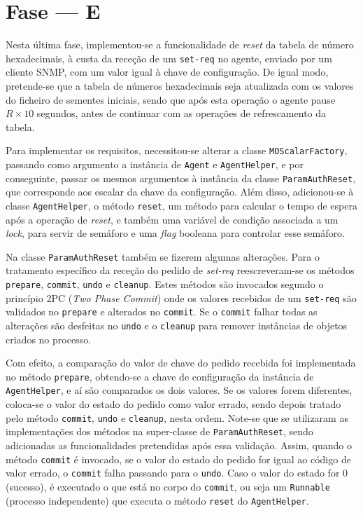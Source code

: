 \section{Fase --- E}

Nesta última fase, implementou-se a funcionalidade de \emph{reset} da tabela de
número hexadecimais, à custa da receção de um \texttt{set-req} no agente,
enviado por um cliente SNMP, com um valor igual à chave de configuração. De
igual modo, pretende-se que a tabela de números hexadecimais seja atualizada com
os valores do ficheiro de sementes iniciais, sendo que após esta operação
o agente pause $R\times10$ segundos, antes de continuar com as operações de
refrescamento da tabela. 


Para implementar os requisitos, necessitou-se alterar a classe
\texttt{MOScalarFactory}, passando como argumento a instância de \texttt{Agent}
e \texttt{AgentHelper}, e por conseguinte, passar os mesmos argumentos
à instância da classe \texttt{ParamAuthReset}, que corresponde aos escalar da
chave da configuração.  Além disso, adicionou-se à classe \texttt{AgentHelper},
o método \texttt{reset}, um método para calcular o tempo de espera após
a operação de \emph{reset}, e também uma variável de condição associada a um
\emph{lock}, para servir de semáforo e uma \emph{flag} booleana para controlar
esse semáforo. 

Na classe \texttt{ParamAuthReset} também se fizerem algumas alterações. Para
o tratamento específico da receção do pedido de \emph{set-req} reescreveram-se
os métodos \texttt{prepare}, \texttt{commit}, \texttt{undo} e \texttt{cleanup}.
Estes métodos são invocados segundo o princípio 2PC (\emph{Two Phase Commit})
onde os valores recebidos de um \texttt{set-req} são validados no
\texttt{prepare} e alterados no \texttt{commit}. Se o \texttt{commit} falhar
todas as alterações são desfeitas no \texttt{undo} e o \texttt{cleanup} para
remover instâncias de objetos criados no processo.       

Com efeito, a comparação do valor de chave do pedido recebida foi implementada no método
\texttt{prepare}, obtendo-se a chave de configuração da instância de
\texttt{AgentHelper}, e aí são comparados os dois valores. Se os valores forem
diferentes, coloca-se o valor do estado do pedido como valor errado, sendo
depois tratado pelo método \texttt{commit}, \texttt{undo} e \texttt{cleanup},
nesta ordem. Note-se que se utilizaram as implementações dos métodos na
super-classe de \texttt{ParamAuthReset}, sendo adicionadas as funcionalidades
pretendidas após essa validação. Assim, quando o método \texttt{commit}
é invocado, se o valor do estado do pedido for igual ao código de valor errado,
o \texttt{commit} falha passando para o \texttt{undo}. Caso o valor do estado
for 0 (sucesso), é executado o que está no corpo do \texttt{commit}, ou seja um
\texttt{Runnable} (processo independente) que executa o método \texttt{reset} do
\texttt{AgentHelper}.  


